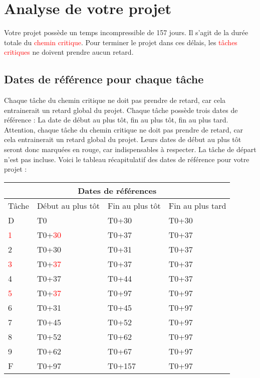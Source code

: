 \documentclass{article}
\begin{document}
\section{Analyse de votre projet}
Votre projet possède un temps incompressible de 157 jours.
    Il s'agit de la durée totale du \textcolor{red}{chemin critique}.
    Pour terminer le projet dans ces délais, les \textcolor{red}{tâches critiques} ne doivent prendre aucun retard.\subsection{Dates de référence pour chaque tâche}Chaque tâche du chemin critique ne doit pas prendre de
    retard, car cela entrainerait un retard global du projet. 
    Chaque tâche possède trois dates de référence : La date de début au plus tôt,
    fin au plus tôt, fin au plus tard.
    Attention, chaque tâche du chemin critique ne doit pas prendre de
    retard, car cela entrainerait un retard global du projet.
    Leurs dates de début au plus tôt seront donc marquées en rouge,
    car indispensables à respecter. La tâche de départ n'est pas incluse. \newpage
    Voici le tableau récapitulatif des dates de référence pour votre projet :\newline 
\begin{tabular}{ |p{3cm}||p{3cm}|p{3cm}|p{3cm}|  }
        \hline
        \multicolumn{4}{|c|}{Dates de références} \\
        \hline 
        Tâche&Début au plus tôt&Fin au plus tôt&Fin au plus tard \\ 
        \hline 
D&T0&T0+30&T0+30 \\ 
\textcolor{red}{1}&T0+\textcolor{red}{30}&T0+37&T0+37 \\ 
2&T0+30&T0+31&T0+37 \\ 
\textcolor{red}{3}&T0+\textcolor{red}{37}&T0+37&T0+37 \\ 
4&T0+37&T0+44&T0+37 \\ 
\textcolor{red}{5}&T0+\textcolor{red}{37}&T0+97&T0+97 \\ 
6&T0+31&T0+45&T0+97 \\ 
7&T0+45&T0+52&T0+97 \\ 
8&T0+52&T0+62&T0+97 \\ 
9&T0+62&T0+67&T0+97 \\ 
F&T0+97&T0+157&T0+97 \\ 
\hline
    \end{tabular} 
\end{document}
